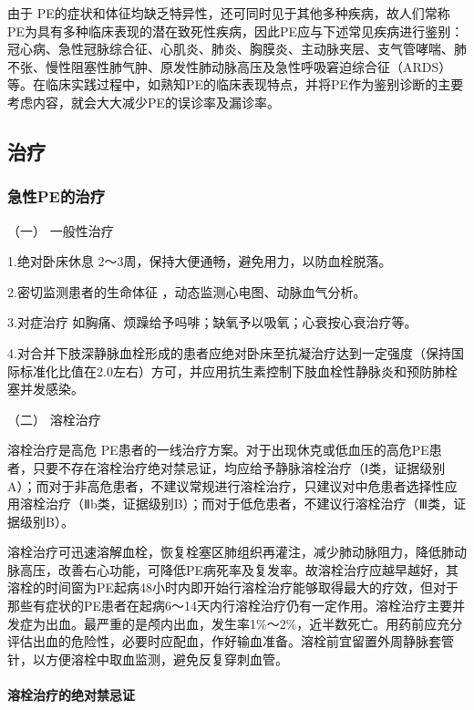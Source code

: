 由于
PE的症状和体征均缺乏特异性，还可同时见于其他多种疾病，故人们常称PE为具有多种临床表现的潜在致死性疾病，因此PE应与下述常见疾病进行鉴别：冠心病、急性冠脉综合征、心肌炎、肺炎、胸膜炎、主动脉夹层、支气管哮喘、肺不张、慢性阻塞性肺气肿、原发性肺动脉高压及急性呼吸窘迫综合征（ARDS）等。在临床实践过程中，如熟知PE的临床表现特点，并将PE作为鉴别诊断的主要考虑内容，就会大大减少PE的误诊率及漏诊率。

\subsection{治疗}

\subsubsection{急性PE的治疗}

\hypertarget{text00278.htmlux5cux23CHP9-8-3-1-1}{}
（一） 一般性治疗

1.绝对卧床休息 2～3周，保持大便通畅，避免用力，以防血栓脱落。

2.密切监测患者的生命体征 ，动态监测心电图、动脉血气分析。

3.对症治疗 如胸痛、烦躁给予吗啡；缺氧予以吸氧；心衰按心衰治疗等。

4.对合并下肢深静脉血栓形成的患者应绝对卧床至抗凝治疗达到一定强度（保持国际标准化比值在2.0左右）方可，并应用抗生素控制下肢血栓性静脉炎和预防肺栓塞并发感染。

\hypertarget{text00278.htmlux5cux23CHP9-8-3-1-2}{}
（二） 溶栓治疗

溶栓治疗是高危
PE患者的一线治疗方案。对于出现休克或低血压的高危PE患者，只要不存在溶栓治疗绝对禁忌证，均应给予静脉溶栓治疗（Ⅰ类，证据级别A）；而对于非高危患者，不建议常规进行溶栓治疗，只建议对中危患者选择性应用溶栓治疗（Ⅱb类，证据级别B）；而对于低危患者，不建议行溶栓治疗（Ⅲ类，证据级别B）。

溶栓治疗可迅速溶解血栓，恢复栓塞区肺组织再灌注，减少肺动脉阻力，降低肺动脉高压，改善右心功能，可降低PE病死率及复发率。故溶栓治疗应越早越好，其溶栓的时间窗为PE起病48小时内即开始行溶栓治疗能够取得最大的疗效，但对于那些有症状的PE患者在起病6～14天内行溶栓治疗仍有一定作用。溶栓治疗主要并发症为出血。最严重的是颅内出血，发生率1\%～2\%，近半数死亡。用药前应充分评估出血的危险性，必要时应配血，作好输血准备。溶栓前宜留置外周静脉套管针，以方便溶栓中取血监测，避免反复穿刺血管。

\paragraph{溶栓治疗的绝对禁忌证}

